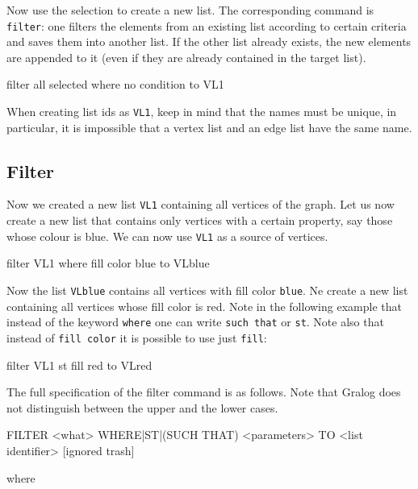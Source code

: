 Now use the selection to create a new list. The corresponding command
is \texttt{filter}: one filters the elements from an existing list
according to certain criteria and saves them into another list. If the
other list already exists, the new elements are appended to it (even
if they are already contained in the target list). 

\begin{tcolorbox}
  filter all selected where no condition to VL1
\end{tcolorbox}

When creating list ids as \texttt{VL1}, keep in mind that the names
must be unique, in particular, it is impossible that a vertex list and
an edge list have the same name.

\subsection{Filter}

Now we created a new list \texttt{VL1} containing all vertices of the
graph. Let us now create a new list that contains only vertices with a
certain property, say those whose colour is blue. We can now use
\texttt{VL1} as a source of vertices.

\begin{tcolorbox}
  filter VL1 where fill color blue to VLblue
\end{tcolorbox}

Now the list \texttt{VLblue} contains all vertices with fill color
\texttt{blue}. Ne create a new list containing all vertices whose fill
color is red. Note in the following example that instead of the
keyword \texttt{where} one can write \texttt{such that} or
\texttt{st}. Note also that instead of \texttt{fill color} it is
possible to use just \texttt{fill}:

\begin{tcolorbox}
  filter VL1 st fill red to VLred
\end{tcolorbox}

The full specification of the filter command is as follows. Note that
Gralog does not distinguish between the upper and the lower cases.


\begin{tcolorbox}[colback=lightpink]
  FILTER <what> WHERE|ST|(SUCH THAT) <parameters> TO <list identifier>
  [ignored trash]
\end{tcolorbox}
 
\noindent where

